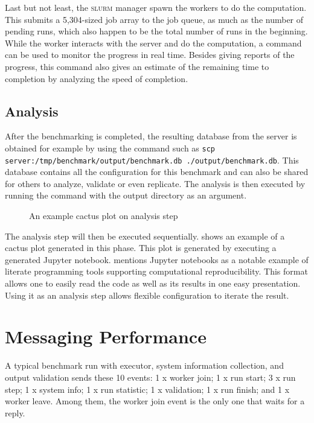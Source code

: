 Last but not least, the \textsc{slurm} manager spawn the workers to do the computation.
This submits a 5,304-sized job array to the job queue, as much as the number of pending runs, which also happen to be the total number of runs in the beginning.
While the worker interacts with the server and do the computation, a  command can be used to monitor the progress in real time.
Besides giving reports of the progress, this command also gives an estimate of the remaining time to completion by analyzing the speed of completion.

\subsection{Analysis}

After the benchmarking is completed, the resulting database from the server is obtained for example by using the  command such as \texttt{scp server:/tmp/benchmark/output/benchmark.db ./output/benchmark.db}.
This database contains all the configuration for this benchmark and can also be shared for others to analyze, validate or even replicate.
The analysis is then executed by running the  command with the output directory as an argument.

\begin{figure}
	\centering
	\caption{An example cactus plot on analysis step}
	\label{fig:eval.cactus}
\end{figure}

The analysis step will then be executed sequentially.
 shows an example of a cactus plot generated in this phase.
This plot is generated by executing a generated Jupyter notebook.
\citet{piccoloToolsTechniquesComputational2016} mentions Jupyter notebooks as a notable example of literate programming tools supporting computational reproducibility.
This format allows one to easily read the code as well as its results in one easy presentation.
Using it as an analysis step allows flexible configuration to iterate the result.

\section{Messaging Performance}

A typical benchmark run with executor, system information collection, and output validation sends these 10 events:
1 x worker join;
1 x run start;
3 x run step;
1 x system info;
1 x run statistic;
1 x validation;
1 x run finish; and
1 x worker leave.
Among them, the worker join event is the only one that waits for a reply.

